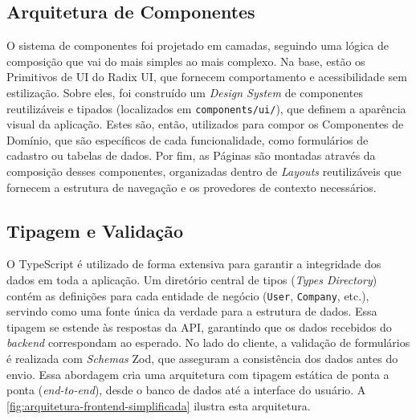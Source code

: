 \subsection{Arquitetura de Componentes}

O sistema de componentes foi projetado em camadas, seguindo uma lógica de composição que vai do mais simples ao mais complexo. Na base, estão os Primitivos de UI do Radix UI, que fornecem comportamento e acessibilidade sem estilização. Sobre eles, foi construído um \textit{Design System} de componentes reutilizáveis e tipados (localizados em \texttt{components/ui/}), que definem a aparência visual da aplicação. Estes são, então, utilizados para compor os Componentes de Domínio, que são específicos de cada funcionalidade, como formulários de cadastro ou tabelas de dados. Por fim, as Páginas são montadas através da composição desses componentes, organizadas dentro de \textit{Layouts} reutilizáveis que fornecem a estrutura de navegação e os provedores de contexto necessários.


\subsection{Tipagem e Validação}

O TypeScript é utilizado de forma extensiva para garantir a integridade dos dados em toda a aplicação. Um diretório central de tipos (\textit{Types Directory}) contém as definições para cada entidade de negócio (\texttt{User}, \texttt{Company}, etc.), servindo como uma fonte única da verdade para a estrutura de dados. Essa tipagem se estende às respostas da API, garantindo que os dados recebidos do \textit{backend} correspondam ao esperado. No lado do cliente, a validação de formulários é realizada com \textit{Schemas} Zod, que asseguram a consistência dos dados antes do envio. Essa abordagem cria uma arquitetura com tipagem estática de ponta a ponta (\textit{end-to-end}), desde o banco de dados até a interface do usuário. A \autoref{fig:arquitetura-frontend-simplificada} ilustra esta arquitetura.

